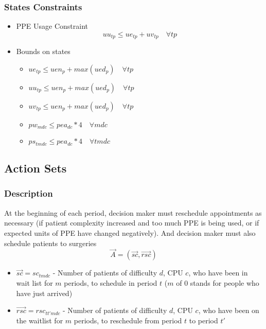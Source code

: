 \documentclass{article}
\begin{document}
\subsubsection{States Constraints}
\begin{itemize}
	\item PPE Usage Constraint
	\begin{equation}
		uu_{tp} \le ue_{tp}+uv_{tp} \quad \forall tp
	\end{equation}
	\item Bounds on states
	\begin{itemize}
		\item $ue_{tp} \le uen_{p} + max(ued_p) \quad \forall tp$
		\item $uu_{tp} \le uen_{p} + max(ued_p) \quad \forall tp$
		\item $uv_{tp} \le uen_{p} + max(ued_p) \quad \forall tp$
		\item $pw_{mdc} \le pea_{dc} * 4 \quad \forall mdc$
		\item $ps_{tmdc} \le pea_{dc} * 4 \quad \forall tmdc$
	\end{itemize}
\end{itemize}

\subsection{Action Sets}
\subsubsection{Description}
At the beginning of each period, decision maker must reschedule appointments as necessary (if patient complexity increased and too much PPE is being used, or if expected units of PPE have changed negatively). And decision maker must also schedule patients to surgeries
\[  \vec{A} = (\vec{sc}, \vec{rsc}) \] 
\begin{itemize}
    \item $\vec{sc} = sc_{tmdc}$ - Number of patients of difficulty $d$, CPU $c$, who have been in wait list for $m$ periods, to schedule in period $t$ ($m$ of 0 stands for people who have just arrived)
	\item $\vec{rsc} = rsc_{tt'mdc}$ - Number of patients of difficulty $d$, CPU $c$, who have been on the waitlist for $m$ periods, to reschedule from period $t$ to period $t'$
\end{itemize}
\end{document}
